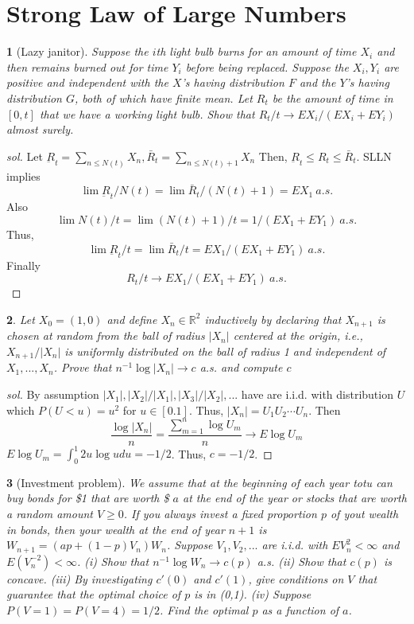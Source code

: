 \documentclass{report}
\newtheorem{ex}{}[section]
\newcommand{\R}{\mathbb R}
\begin{document}
\section{Strong Law of Large Numbers}
\begin{ex}[Lazy janitor]
Suppose the $i$th light bulb burns for an amount of time $X_i$ and then remains burned out for time $Y_i$ before being replaced. Suppose the $X_i, Y_i$ are positive and independent with the $X$’s having distribution $F$ and the $Y$’s having distribution $G$, both of which have finite mean. Let $R_t$ be the amount of time in $[0, t]$ that we have a working light bulb. Show that $R_t/t \to EX_i/(EX_i + EY_i)$ almost surely.
\end{ex}
\begin{proof}[sol]
Let $\underbar R_t = \sum_{n \le N(t)}X_n, \bar R_t = \sum_{n \le N(t) + 1}X_n$ Then, $\underbar R_t \le R_t \le \bar R_t$. SLLN implies
\[\lim \underbar R_t /N(t) = \lim \bar R_t / (N(t)  + 1) = EX_1 \ a.s.\]
Also
\[\lim N(t) / t = \lim (N(t) +1)/t = 1 /(EX_1  +EY_1)\ a.s. \]
Thus,
\[\lim\underbar R_t/t = \lim\bar R_t/t = EX_1  / (EX_1 + EY_1)\
 a.s.\]
Finally
\[R_t/t \to EX_1  / (EX_1 + EY_1)\ a.s.\]
\end{proof}
\begin{ex}
Let $X_0 = (1,0)$ and define $X_n \in \R^2$ inductively by declaring that $X_{n+1}$ is chosen at random from the ball of radius $|X_n|$ centered at the origin, i.e., $X_{n+1}/|X_n|$ is uniformly distributed on the ball of radius 1 and independent of $X_1,...,X_n$. Prove that $n^{-1}\log |X_n| \to c$ a.s. and compute $c$
\end{ex}
\begin{proof}[sol]
By assumption $|X_1|, |X_2|/|X_1|, |X_3|/|X_2|,...$ have are i.i.d. with distribution $U$ which $P(U < u) = u^2$ for $u \in [0.1]$. Thus, $|X_n| = U_1U_2\dotsb U_n$. Then
\[\frac{\log|X_n|}{n} = \frac{\sum_{m=1}^n \log U_m}{n} \to E \log U_m\]
$E\log U_m = \int_0^1 2u\log udu = -1/2$. Thus, $c = -1/2$.
\end{proof}
\begin{ex}[Investment problem]
We assume that at the beginning of each year totu can buy bonds for \$1 that are worth \$ $a$ at the end of the year or stocks that are worth a random amount $V \ge 0$. If you always invest a fixed proportion $p$ of yout wealth in bonds, then your wealth at the end of year $n+1$ is $W_{n+1} = (ap + (1-p)V_n)W_n$. Suppose $V_1,V_2,...$ are i.i.d. with $EV_n^2 < \infty$ and $E(V_n^{-2}) < \infty$. (i) Show that $n^{-1}\log W_n \to c(p)$ a.s. (ii) Show that $c(p)$ is concave. (iii) By investigating $c'(0)$ and $c'(1)$, give conditions on $V$ that guarantee that the optimal choice of $p$ is in (0,1). (iv) Suppose $P(V = 1) = P(V = 4) = 1/2$. Find the optimal $p$ as a function of $a$.
\end{ex}
\end{document}
